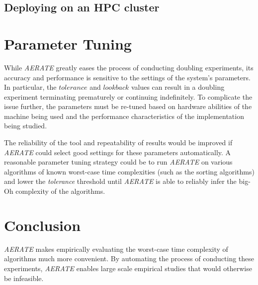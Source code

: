 \documentclass[10pt,twocolumn]{article}
\begin{document}
    \subsection{Deploying on an HPC cluster}
\section{Parameter Tuning}
  While \textit{AERATE} greatly eases the process of conducting
  doubling experiments, its accuracy and performance is
  sensitive to the settings of the system's parameters.  In particular,
  the $\mathit{tolerance}$ and $\mathit{lookback}$ values can result in
  a doubling experiment terminating prematurely or continuing
  indefinitely.
  To complicate the issue further, the parameters must be re-tuned based
  on hardware abilities of the machine being used and the performance
  characteristics of the implementation being studied.

  The reliability of the tool and repeatability of results would be
  improved if \textit{AERATE} could select good settings for these
  parameters automatically. A reasonable parameter tuning strategy could
  be to run \textit{AERATE} on various algorithms of known worst-case
  time complexities (such as the sorting algorithms) and lower the
  \textit{tolerance} threshold until \textit{AERATE} is able to reliably 
  infer the big-Oh complexity of the algorithms. 

\section{Conclusion}
  \textit{AERATE} makes empirically evaluating the worst-case time
  complexity of algorithms much more convenient. By automating the
  process of conducting these experiments, \textit{AERATE} enables large
  scale empirical studies that would otherwise be infeasible.

\setlength{\bibitemsep}{.075in}
{\footnotesize
  
}
\end{document}
